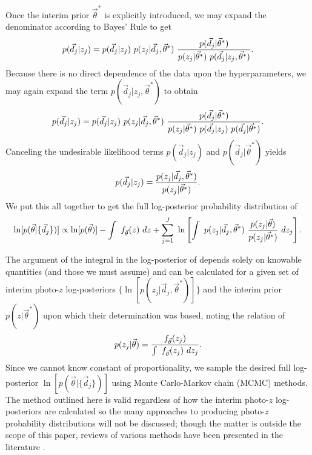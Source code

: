 Once the interim prior $\vec{\theta}^{*}$ is explicitly introduced, we may expand the denominator according to Bayes' Rule to get 
\begin{equation}
\eqlabel{eq:expand}
p(\vec{d}_{j}|z_{j}) = p(\vec{d}_{j}|z_{j})\ p(z_{j}|\vec{d}_{j},\vec{\theta}^{*})\ \frac{p(\vec{d}_{j}|\vec{\theta}^{*})}{p(z_{j}|\vec{\theta}^{*})\ p(\vec{d}_{j}|z_{j},\vec{\theta}^{*})}.
\end{equation}
Because there is no direct dependence of the data upon the hyperparameters, we may again expand the term $p(\vec{d}_{j}|z_{j},\vec{\theta}^{*})$ to obtain 
\begin{equation}
\eqlabel{eq:indterm}
p(\vec{d}_{j}|z_{j}) = p(\vec{d}_{j}|z_{j})\ p(z_{j}|\vec{d}_{j},\vec{\theta}^{*})\ \frac{p(\vec{d}_{j}|\vec{\theta}^{*})}{p(z_{j}|\vec{\theta}^{*})\ p(\vec{d}_{j}|z_{j})\ p(\vec{d}_{j}|\vec{\theta}^{*})}.
\end{equation}
Canceling the undesirable likelihood terms $p(\vec{d}_{j}|z_{j})$ and $p(\vec{d}_{j}|\vec{\theta}^{*})$ yields
\begin{equation}
\eqlabel{eq:cancel}
p(\vec{d}_{j}|z_{j}) = \frac{p(z_{j}|\vec{d}_{j},\vec{\theta}^{*})}{p(z_{j}|\vec{\theta}^{*})}.
\end{equation}
We put this all together to get the full log-posterior probability distribution of 
\begin{equation}
\eqlabel{eq:final}
\ln[p(\vec{\theta}|\{\vec{d}_{j}\})] \propto \ln[p(\vec{\theta})]-\int\ f_{\vec{\theta}}(z)\ dz + \sum_{j=1}^{J}\ \ln\left[\int\ p(z_{j}|\vec{d}_{j},\vec{\theta}^{*})\ \frac{p(z_{j}|\vec{\theta})}{p(z_{j}|\vec{\theta}^{*})}\ dz_{j}\right].
\end{equation}

The argument of the integral in the log-posterior of  depends solely on knowable quantities (and those we must assume) and can be calculated for a given set of interim photo-$z$ log-posteriors $\{\ln[p(z_{j}|\vec{d}_{j},\vec{\theta}^{*})]\}$ and the interim prior $p(z|\vec{\theta}^{*})$ upon which their determination was based, noting the relation of 
\begin{equation}
\eqlabel{eq:params}
p(z_{j}|\vec{\theta}) = \frac{f_{\vec{\theta}}(z_{j})}{\int\ f_{\vec{\theta}}(z_{j})\ dz_{j}}.
\end{equation}
Since we cannot know constant of proportionality, we sample the desired full log-posterior $\ln[p(\vec{\theta}|\{\vec{d}_{j}\})]$ using Monte Carlo-Markov chain (MCMC) methods.  
The method outlined here is valid regardless of how the interim photo-$z$ log-posteriors are calculated so the many approaches to producing photo-$z$ probability distributions will not be discussed; though the matter is outside the scope of this paper, reviews of various methods have been presented in the literature \citep{Sheldon2012, Ball2008, CarrascoKind2013, CarrascoKind2014a}.


